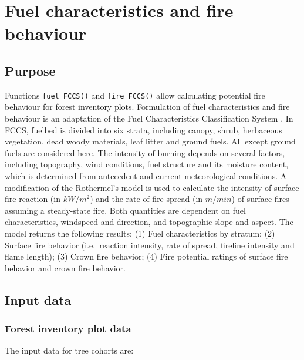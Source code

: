 \documentclass[]{book}
\begin{document}
\hypertarget{fuel-characteristics-and-fire-behaviour}{%
\chapter{Fuel characteristics and fire behaviour}\label{fuel-characteristics-and-fire-behaviour}}

\hypertarget{purpose}{%
\section{Purpose}\label{purpose}}

Functions \texttt{fuel\_FCCS()} and \texttt{fire\_FCCS()} allow calculating potential fire behaviour for forest inventory plots. Formulation of fuel characteristics and fire behaviour is an adaptation of the Fuel Characteristics Classification System \citep[FCCS;][]{Prichard2013}. In FCCS, fuelbed is divided into six strata, including canopy, shrub, herbaceous vegetation, dead woody materials, leaf litter and ground fuels. All except ground fuels are considered here. The intensity of burning depends on several factors, including topography, wind conditions, fuel structure and its moisture content, which is determined from antecedent and current meteorological conditions. A modification of the Rothermel's \citeyearpar{Rothermel1972} model is used to calculate the intensity of surface fire reaction (in \(kW/m^2\)) and the rate of fire spread (in \(m/min\)) of surface fires assuming a steady-state fire. Both quantities are dependent on fuel characteristics, windspeed and direction, and topographic slope and aspect. The model returns the following results: (1) Fuel characteristics by stratum; (2) Surface fire behavior (i.e.~reaction intensity, rate of spread, fireline intensity and flame length); (3) Crown fire behavior; (4) Fire potential ratings of surface fire behavior and crown fire behavior.

\hypertarget{input-data}{%
\section{Input data}\label{input-data}}

\hypertarget{forest-inventory-plot-data}{%
\subsection{Forest inventory plot data}\label{forest-inventory-plot-data}}

The input data for tree cohorts are:
\end{document}
